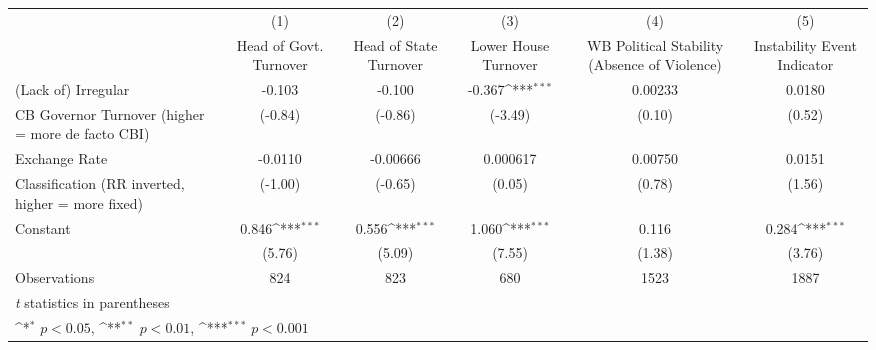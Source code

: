 {
\def\sym#1{\ifmmode^{#1}\else\(^{#1}\)\fi}
\begin{tabular}{l*{5}{c}}
\hline\hline
                    &\multicolumn{1}{c}{(1)}&\multicolumn{1}{c}{(2)}&\multicolumn{1}{c}{(3)}&\multicolumn{1}{c}{(4)}&\multicolumn{1}{c}{(5)}\\
                    &\multicolumn{1}{c}{Head of Govt. Turnover}&\multicolumn{1}{c}{Head of State Turnover}&\multicolumn{1}{c}{Lower House Turnover}&\multicolumn{1}{c}{WB Political Stability (Absence of Violence)}&\multicolumn{1}{c}{Instability Event Indicator}\\
\hline
(Lack of) Irregular &      -0.103         &      -0.100         &      -0.367\sym{***}&     0.00233         &      0.0180         \\
CB Governor Turnover (higher = more de facto CBI)&     (-0.84)         &     (-0.86)         &     (-3.49)         &      (0.10)         &      (0.52)         \\
[1em]
Exchange Rate       &     -0.0110         &    -0.00666         &    0.000617         &     0.00750         &      0.0151         \\
Classification (RR inverted, higher = more fixed)&     (-1.00)         &     (-0.65)         &      (0.05)         &      (0.78)         &      (1.56)         \\
[1em]
Constant            &       0.846\sym{***}&       0.556\sym{***}&       1.060\sym{***}&       0.116         &       0.284\sym{***}\\
                    &      (5.76)         &      (5.09)         &      (7.55)         &      (1.38)         &      (3.76)         \\
\hline
Observations        &         824         &         823         &         680         &        1523         &        1887         \\
\hline\hline
\multicolumn{6}{l}{\footnotesize \textit{t} statistics in parentheses}\\
\multicolumn{6}{l}{\footnotesize \sym{*} \(p<0.05\), \sym{**} \(p<0.01\), \sym{***} \(p<0.001\)}\\
\end{tabular}
}
